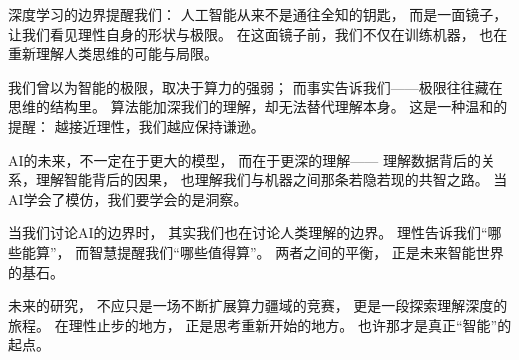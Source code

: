 深度学习的边界提醒我们：  
人工智能从来不是通往全知的钥匙，  
而是一面镜子，让我们看见理性自身的形状与极限。  
在这面镜子前，我们不仅在训练机器，  
也在重新理解人类思维的可能与局限。

我们曾以为智能的极限，取决于算力的强弱；  
而事实告诉我们——极限往往藏在思维的结构里。  
算法能加深我们的理解，却无法替代理解本身。  
这是一种温和的提醒：  
越接近理性，我们越应保持谦逊。

AI的未来，不一定在于更大的模型，  
而在于更深的理解——  
理解数据背后的关系，理解智能背后的因果，  
也理解我们与机器之间那条若隐若现的共智之路。  
当AI学会了模仿，我们要学会的是洞察。

当我们讨论AI的边界时，  
其实我们也在讨论人类理解的边界。  
理性告诉我们“哪些能算”，  
而智慧提醒我们“哪些值得算”。  
两者之间的平衡，  
正是未来智能世界的基石。

未来的研究，  
不应只是一场不断扩展算力疆域的竞赛，  
更是一段探索理解深度的旅程。  
在理性止步的地方，  
正是思考重新开始的地方。  
也许那才是真正“智能”的起点。

